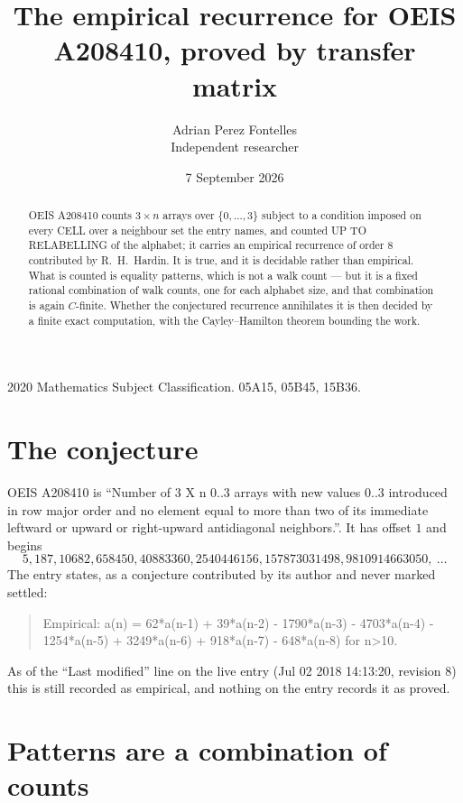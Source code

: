 \documentclass[11pt,a4paper]{article}
\title{The empirical recurrence for OEIS A208410, proved by transfer matrix}
\author{Adrian Perez Fontelles\\ \small Independent researcher}
\date{7 September 2026}
\theoremstyle{plain}
\theoremstyle{definition}
\begin{document}
\maketitle

\begin{abstract}
OEIS A208410 counts $3\times n$ arrays over $\{0,\dots,3\}$ subject to a condition imposed on
every CELL over a neighbour set the entry names, and counted UP TO RELABELLING of the
alphabet; it carries an empirical recurrence of order $8$ contributed by
R.~H.~Hardin. It is true, and it is decidable rather than empirical. What is counted is
equality patterns, which is not a walk count --- but it is a fixed rational combination of
walk counts, one for each alphabet size, and that combination is again $C$-finite. Whether the
conjectured recurrence annihilates it is then decided by a finite exact computation, with the
Cayley--Hamilton theorem bounding the work.
\end{abstract}

\noindent\small 2020 Mathematics Subject Classification. 05A15, 05B45, 15B36.\normalsize

\section{The conjecture}

OEIS A208410 is ``Number of 3 X n 0..3 arrays with new values 0..3 introduced in row major order and no element equal to more than two of its immediate leftward or upward or right-upward antidiagonal neighbors.''. It has offset $1$ and begins
\[
5, 187, 10682, 658450, 40883360, 2540446156, 157873031498, 9810914663050,\ \dots
\]
The entry states, as a conjecture contributed by its author and never marked settled:
\begin{quote}
Empirical: a(n) = 62*a(n-1) + 39*a(n-2) - 1790*a(n-3) - 4703*a(n-4) - 1254*a(n-5) + 3249*a(n-6) + 918*a(n-7) - 648*a(n-8) for n>10.
\end{quote}
As of the ``Last modified'' line on the live entry (Jul 02 2018 14:13:20, revision 8) this is still
recorded as empirical, and nothing on the entry records it as proved.

\section{Patterns are a combination of counts}
\end{document}
